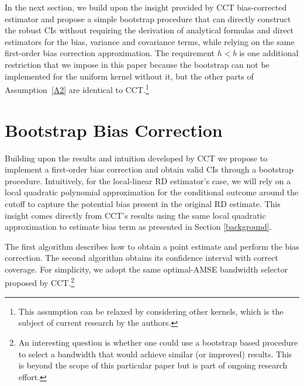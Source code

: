 \documentclass[12pt,fleqn]{article}
\begin{document}
In the next section, we build upon the insight provided by CCT bias-corrected
estimator and propose a simple bootstrap procedure that can directly construct
the robust CIs without requiring the derivation of analytical formulas and
direct estimators for the bias, variance and covariance terms, while relying on
the same first-order bias correction approximation. The requirement $h < b$ is
one additional restriction that we impose in this paper because the bootstrap
can not be implemented for the uniform kernel without it, but the other parts of
Assumption~\ref{A2} are identical to CCT.\footnote{%
  This assumption can be relaxed by considering other kernels, which is the
  subject of current research by the authors.} %

\section{Bootstrap Bias Correction}\label{boot}

Building upon the results and intuition developed by CCT we propose to implement a first-order bias correction and obtain valid CIs through a bootstrap procedure.
Intuitively, for the local-linear RD estimator's case, we will rely on a local quadratic polynomial approximation for the conditional outcome around the cutoff to capture the potential bias present in the original RD estimate. This insight comes directly from CCT's results using the same local quadratic approximation to estimate bias term as presented in Section \ref{background}.

The first algorithm describes how to obtain a point estimate and perform the bias correction. The second algorithm obtains its confidence interval with correct coverage. For simplicity, we adopt the same optimal-AMSE bandwidth selector proposed by CCT.\footnote{An interesting question is whether one could use a bootstrap based procedure to select a bandwidth that would achieve similar (or improved) results. This is beyond the scope of this particular paper but is part of ongoing research effort.} 
\end{document}
